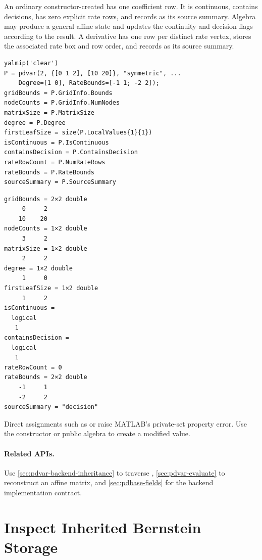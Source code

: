 An ordinary constructor-created  has one coefficient row. It is continuous, contains decisions, has zero explicit rate rows, and records  as its source summary. Algebra may produce a general affine state and updates the continuity and decision flags according to the result. A derivative has one row per distinct rate vertex, stores the associated rate box and row order, and records  as its source summary.

\examplehead
\begin{lstlisting}[style=dpmatlab]
yalmip('clear')
P = pdvar(2, {[0 1 2], [10 20]}, "symmetric", ...
    Degree=[1 0], RateBounds=[-1 1; -2 2]);
gridBounds = P.GridInfo.Bounds
nodeCounts = P.GridInfo.NumNodes
matrixSize = P.MatrixSize
degree = P.Degree
firstLeafSize = size(P.LocalValues{1}{1})
isContinuous = P.IsContinuous
containsDecision = P.ContainsDecision
rateRowCount = P.NumRateRows
rateBounds = P.RateBounds
sourceSummary = P.SourceSummary
\end{lstlisting}
\begin{lstlisting}[style=dpoutput]
gridBounds = 2×2 double
     0     2
    10    20
nodeCounts = 1×2 double
     3     2
matrixSize = 1×2 double
     2     2
degree = 1×2 double
     1     0
firstLeafSize = 1×2 double
     1     2
isContinuous =
  logical
   1
containsDecision =
  logical
   1
rateRowCount = 0
rateBounds = 2×2 double
    -1     1
    -2     2
sourceSummary = "decision"
\end{lstlisting}

Direct assignments such as  or  raise MATLAB's private-set property error. Use the constructor or public algebra to create a modified value.

\paragraph{Related APIs.}
Use \cref{sec:pdvar-backend-inheritance} to traverse , \cref{sec:pdvar-evaluate} to reconstruct an affine matrix, and \cref{sec:pdbase-fields} for the backend implementation contract.

\section{Inspect Inherited Bernstein Storage}
\label{sec:pdvar-backend-inheritance}

